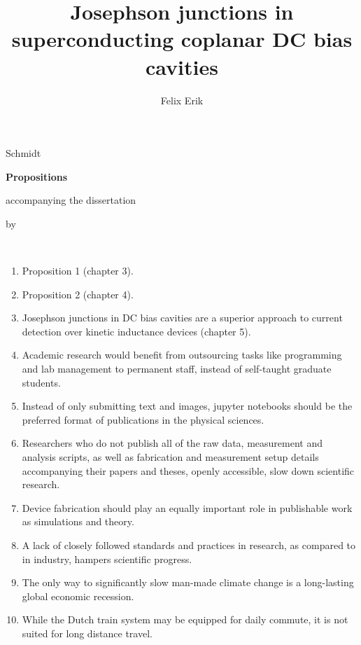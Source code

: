 \documentclass{dissertation-edit}
\begin{document}
\title[Fundamental studies and applications]{Josephson junctions in superconducting coplanar DC bias cavities}
\author{Felix Erik}{Schmidt}

\begin{center}

{\Large\titlefont\bfseries Propositions}

\bigskip

accompanying the dissertation

\bigskip

{\makeatletter
\titlestyle\bfseries\large\@title
\makeatother}

{\makeatletter
\ifx\@subtitle\undefined\else
    \titlefont\titleshape\@subtitle
\fi
\makeatother}

\bigskip

by

\bigskip

\makeatletter
{\large\titlefont\bfseries\@firstname\ {\titleshape\@lastname}}
\makeatother

\end{center}

\bigskip
\bigskip

\begin{enumerate}

\item Proposition 1 (chapter 3).
%
\item Proposition 2 (chapter 4).
%
\item Josephson junctions in DC bias cavities are a superior approach to current detection over kinetic inductance devices (chapter 5).
%
\item Academic research would benefit from outsourcing tasks like programming and lab management to permanent staff, instead of self-taught graduate students.
%
\item Instead of only submitting text and images, jupyter notebooks should be the preferred format of publications in the physical sciences.
%
\item Researchers who do not publish all of the raw data, measurement and analysis scripts, as well as fabrication and measurement setup details accompanying their papers and theses, openly accessible, slow down scientific research.
%
\item Device fabrication should play an equally important role in publishable work as simulations and theory.
%
\item A lack of closely followed standards and practices in research, as compared to in industry, hampers scientific progress.
%
\item The only way to significantly slow man-made climate change is a long-lasting global economic recession.
%
\item While the Dutch train system may be equipped for daily commute, it is not suited for long distance travel.

\end{enumerate}
\end{document}
